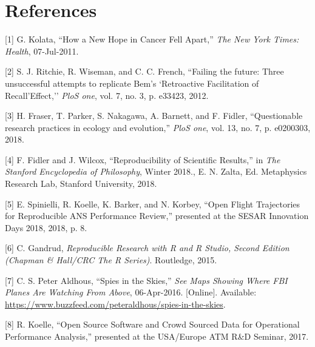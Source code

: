 \documentclass[conference,final,a4paper,]{IEEEtran}
\begin{document}
\hypertarget{references}{%
\section*{References}\label{references}}

\vspace{6pt}
\setlength{\parskip}{0pt}
\footnotesize
\setlength{\parindent}{0cm}

\hypertarget{refs}{}
\leavevmode\hypertarget{ref-kolata_2011}{}%
{[}1{]} G. Kolata, ``How a New Hope in Cancer Fell Apart,'' \emph{The New York Times: Health}, 07-Jul-2011.

\leavevmode\hypertarget{ref-ritchie_2012}{}%
{[}2{]} S. J. Ritchie, R. Wiseman, and C. C. French, ``Failing the future: Three unsuccessful attempts to replicate Bem's `Retroactive Facilitation of Recall'Effect,'' \emph{PloS one}, vol. 7, no. 3, p. e33423, 2012.

\leavevmode\hypertarget{ref-fraser_etal_2018}{}%
{[}3{]} H. Fraser, T. Parker, S. Nakagawa, A. Barnett, and F. Fidler, ``Questionable research practices in ecology and evolution,'' \emph{PloS one}, vol. 13, no. 7, p. e0200303, 2018.

\leavevmode\hypertarget{ref-fidler_wilcox_2018}{}%
{[}4{]} F. Fidler and J. Wilcox, ``Reproducibility of Scientific Results,'' in \emph{The Stanford Encyclopedia of Philosophy}, Winter 2018., E. N. Zalta, Ed. Metaphysics Research Lab, Stanford University, 2018.

\leavevmode\hypertarget{ref-spinielli_2018}{}%
{[}5{]} E. Spinielli, R. Koelle, K. Barker, and N. Korbey, ``Open Flight Trajectories for Reproducible ANS Performance Review,'' presented at the SESAR Innovation Days 2018, 2018, p. 8.

\leavevmode\hypertarget{ref-gandrud_2015}{}%
{[}6{]} C. Gandrud, \emph{Reproducible Research with R and R Studio, Second Edition (Chapman \& Hall/CRC The R Series)}. Routledge, 2015.

\leavevmode\hypertarget{ref-peteraldhous_2016}{}%
{[}7{]} C. S. Peter Aldhous, ``Spies in the Skies,'' \emph{See Maps Showing Where FBI Planes Are Watching From Above}, 06-Apr-2016. {[}Online{]}. Available: \url{https://www.buzzfeed.com/peteraldhous/spies-in-the-skies}.

\leavevmode\hypertarget{ref-koelle_open_2017}{}%
{[}8{]} R. Koelle, ``Open Source Software and Crowd Sourced Data for Operational Performance Analysis,'' presented at the USA/Europe ATM R\&D Seminar, 2017.
\end{document}

